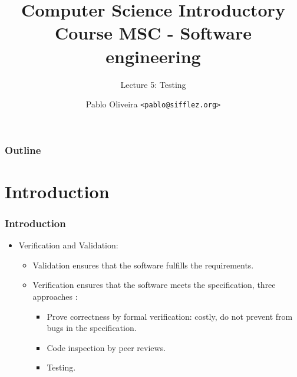 \documentclass[10pt]{beamer}
\title{Computer Science Introductory Course MSC - Software engineering}
\subtitle{Lecture 5: Testing}
\author[Pablo Oliveira]{Pablo Oliveira \texttt{<pablo@sifflez.org>}}
\institute{ENST}
\date{}
\begin{document}
\begin{frame}
  \titlepage
\end{frame}

\begin{frame}
  \frametitle{Outline}
  \tableofcontents
\end{frame}

\section{Introduction}
\begin{frame}
\frametitle{Introduction}
\begin{itemize}
  \item Verification and Validation:
    \begin{itemize}
    \item Validation ensures that the software fulfills the requirements.
    \item \alert{Verification} ensures that the software meets the
      specification, three approaches :
      \begin{itemize}
      \item Prove correctness by formal verification: costly, do not prevent
        from bugs in the specification.
      \item Code inspection by peer reviews.
      \item \alert{Testing}.
      \end{itemize}
    \end{itemize}
\end{itemize}
\end{frame}
\end{document}
